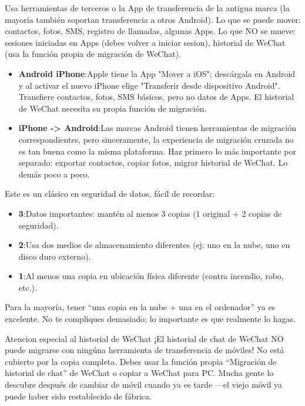 Usa herramientas de terceros o la App de transferencia de la antigua marca (la mayoría también soportan transferencia a otros Android). Lo que se puede mover: contactos, fotos, SMS, registro de llamadas, algunas Apps. Lo que NO se mueve: sesiones iniciadas en Apps (debes volver a iniciar sesion), historial de WeChat (usa la función propia de migración de WeChat).


\begin{itemize}
  \item \textbf{Android iPhone}:Apple tiene la App "Mover a iOS"; descárgala en Android y al activar el nuevo iPhone elige "Transferir desde dispositivo Android". Transfiere contactos, fotos, SMS básicos, pero no datos de Apps. El historial de WeChat necesita su propia función de migración.
  \item \textbf{iPhone -> Android}:Las marcas Android tienen herramientas de migración correspondientes, pero sinceramente, la experiencia de migración cruzada no es tan buena como la misma plataforma. Haz primero lo más importante por separado: exportar contactos, copiar fotos, migrar historial de WeChat. Lo demás poco a poco.
\end{itemize}


Este es un clásico en seguridad de datos, fácil de recordar:

\begin{itemize}
  \item \textbf{3}:Datos importantes: mantén al menos 3 copias (1 original + 2 copias de seguridad).
  \item \textbf{2}:Usa dos medios de almacenamiento diferentes (ej: uno en la nube, uno en disco duro externo).
  \item \textbf{1}:Al menos una copia en ubicación física diferente (contra incendio, robo, etc.).
\end{itemize}

Para la mayoría, tener “una copia en la nube + una en el ordenador” ya es excelente. No te compliques demasiado; lo importante es que realmente lo hagas.

\begin{tcbwarn}{Atencion especial al historial de WeChat}
¡El historial de chat de WeChat NO puede migrarse con ningúna herramienta de transferencia de móviles! No está cubierto por la copia completa. Debes usar la función propia “Migración de historial de chat” de WeChat o copiar a WeChat para PC. Mucha gente lo descubre después de cambiar de móvil cuando ya es tarde —el viejo móvil ya puede haber sido restablecido de fábrica.

\end{tcbwarn}

